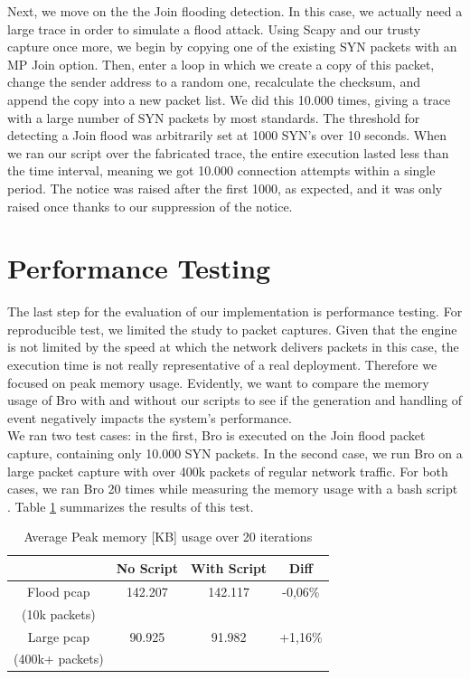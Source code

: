 Next, we move on the the Join flooding detection. In this case, we actually need a large trace in order to simulate a flood attack. Using Scapy and our trusty capture once more, we begin by copying one of the existing SYN packets with an MP Join option. Then, enter a loop in which we create a copy of this packet, change the sender address to a random one, recalculate the checksum, and append the copy into a new packet list. We did this 10.000 times, giving a trace with a large number of SYN packets by most standards. The threshold for detecting a Join flood was arbitrarily set at 1000 SYN's over 10 seconds. When we ran our script over the fabricated trace, the entire execution lasted less than the time interval, meaning we got 10.000 connection attempts within a single period. The notice was raised after the first 1000, as expected, and it was only raised once thanks to our suppression of the notice.

\section{Performance Testing}
The last step for the evaluation of our implementation is performance testing. For reproducible test, we limited the study to packet captures. Given that the engine is not limited by the speed at which the network delivers packets in this case, the execution time is not really representative of a real deployment. Therefore we focused on peak memory usage. Evidently, we want to compare the memory usage of Bro with and without our scripts to see if the generation and handling of event negatively impacts the system's performance.\\

We ran two test cases: in the first, Bro is executed on the Join flood packet capture, containing only 10.000 SYN packets. In the second case, we run Bro on a large packet capture with over 400k packets of regular network traffic. For both cases, we ran Bro 20 times while measuring the memory usage with a bash script \cite{memusg}. Table \ref{table:perf} summarizes the results of this test.\\

\begin{table}
\centering
\begin{tabular}{| c | c | c | c |}
\hline
 & No Script & With Script & Diff \\ \hline
Flood pcap & 142.207 & 142.117 & -0,06\% \\
(10k packets) & & & \\ \hline
Large pcap & 90.925 & 91.982 & +1,16\% \\
(400k+ packets) & &  & \\ \hline
\end{tabular}
\caption{Average Peak memory [KB] usage over 20 iterations}
\label{table:perf}
\end{table}

